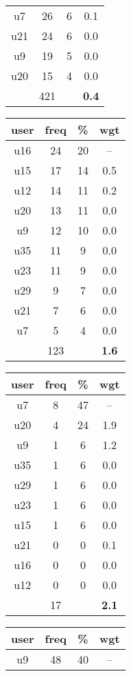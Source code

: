 \begin{appendices}
\begin{table}
\begin{tabular}{ |c|c|c|c| }
	u7 & 26 & 6 & 0.1 \\
	u21 & 24 & 6 & 0.0 \\
	u9 & 19 & 5 & 0.0 \\
	u20 & 15 & 4 & 0.0 \\
	 & 421 & & \textbf{0.4} \\
	\hline
\end{tabular}
\begin{tabular}{ |c|c|c|c| }
	\hline
	\textbf{user} & \textbf{freq} & \textbf{\%} & \textbf{wgt} \\
	\hline
	u16 & 24 & 20 & -- \\
	u15 & 17 & 14 & 0.5 \\
	u12 & 14 & 11 & 0.2 \\
	u20 & 13 & 11 & 0.0 \\
	u9 & 12 & 10 & 0.0 \\
	u35 & 11 & 9 & 0.0 \\
	u23 & 11 & 9 & 0.0 \\
	u29 & 9 & 7 & 0.0 \\
	u21 & 7 & 6 & 0.0 \\
	u7 & 5 & 4 & 0.0 \\
	 & 123 & & \textbf{1.6} \\
	\hline
\end{tabular}
\begin{tabular}{ |c|c|c|c| }
	\hline
	\textbf{user} & \textbf{freq} & \textbf{\%} & \textbf{wgt} \\
	\hline
	u7 & 8 & 47 & -- \\
	u20 & 4 & 24 & 1.9 \\
	u9 & 1 & 6 & 1.2 \\
	u35 & 1 & 6 & 0.0 \\
	u29 & 1 & 6 & 0.0 \\
	u23 & 1 & 6 & 0.0 \\
	u15 & 1 & 6 & 0.0 \\
	u21 & 0 & 0 & 0.1 \\
	u16 & 0 & 0 & 0.0 \\
	u12 & 0 & 0 & 0.0 \\
	 & 17 & & \textbf{2.1} \\
	\hline
\end{tabular}
\begin{tabular}{ |c|c|c|c| }
	\hline
	\textbf{user} & \textbf{freq} & \textbf{\%} & \textbf{wgt} \\
	\hline
	u9 & 48 & 40 & -- \\

\end{tabular}
\end{table}
\end{appendices}
